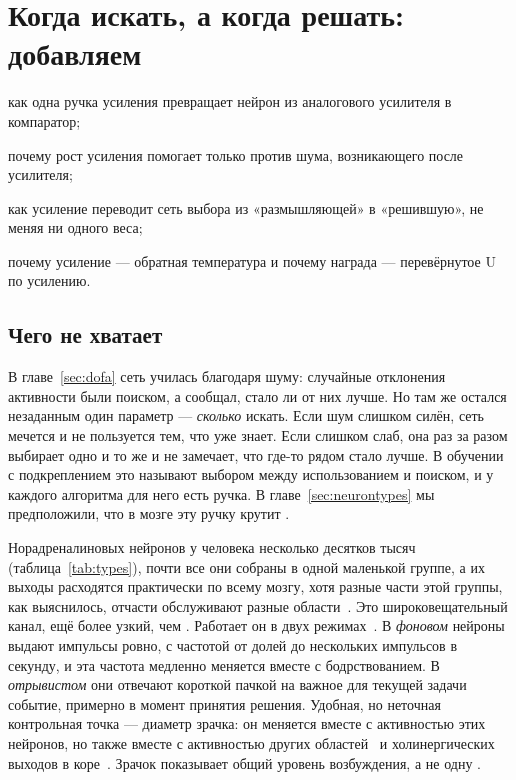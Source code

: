 \chapter{Когда искать, а когда решать: добавляем }
\label{sec:nora}
\begin{chaptergoals}
\item как одна ручка усиления превращает нейрон из аналогового усилителя в компаратор;
\item почему рост усиления помогает только против шума, возникающего после усилителя;
\item как усиление переводит сеть выбора из «размышляющей» в «решившую», не меняя ни одного веса;
\item почему усиление --- обратная температура и почему награда --- перевёрнутое U по усилению.
\end{chaptergoals}

\section{Чего не хватает}

В главе~\ref{sec:dofa} сеть училась благодаря шуму: случайные отклонения активности были поиском, а  сообщал, стало ли от них лучше. Но там же остался незаданным один параметр --- \emph{сколько} искать. Если шум слишком силён, сеть мечется и не пользуется тем, что уже знает. Если слишком слаб, она раз за разом выбирает одно и то же и не замечает, что где-то рядом стало лучше. В обучении с подкреплением это называют выбором между использованием и поиском, и у каждого алгоритма для него есть ручка. В главе~\ref{sec:neurontypes} мы предположили, что в мозге эту ручку крутит .

Норадреналиновых нейронов у человека несколько десятков тысяч (таблица~\ref{tab:types}), почти все они собраны в одной маленькой группе, а их выходы расходятся практически по всему мозгу, хотя разные части этой группы, как выяснилось, отчасти обслуживают разные области~\cite{Poe2020}. Это широковещательный канал, ещё более узкий, чем . Работает он в двух режимах~\cite{AstonJones2005}. В \emph{фоновом} нейроны выдают импульсы ровно, с частотой от долей до нескольких импульсов в секунду, и эта частота медленно меняется вместе с бодрствованием. В \emph{отрывистом} они отвечают короткой пачкой на важное для текущей задачи событие, примерно в момент принятия решения. Удобная, но неточная контрольная точка --- диаметр зрачка: он меняется вместе с активностью этих нейронов, но также вместе с активностью других областей~\cite{Joshi2016} и холинергических выходов в коре~\cite{Reimer2016}. Зрачок показывает общий уровень возбуждения, а не одну .

